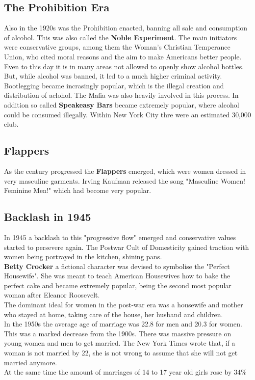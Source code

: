 \documentclass{article}
\begin{document}
	\subsection{The Prohibition Era}
	Also in the 1920s was the Prohibition enacted, banning all sale and consumption of alcohol. This was also called the \textbf{Noble Experiment}. The main initiators were conservative groups, among them the Woman's Christian Temperance Union, who cited moral reasons and the aim to make Americans better people. Even to this day it is in many areas not allowed to openly show alcohol bottles. \\
	But, while alcohol was banned, it led to a much higher criminal activity. Bootlegging became incrasingly popular, which is the illegal creation and distribution of aclohol. The Mafia was also heavily involved in this process. In addition so called \textbf{Speakeasy Bars} became extremely popular, where alcohol could be consumed illegally. Within New York City thre were an estimated 30,000 club. \\
	\subsection{Flappers}
	As the century progressed the \textbf{Flappers} emerged, which were women dressed in very masculine garments. Irving Kaufman released the song "Masculine Women! Feminine Men!" which had become very popular.
	\subsection{Backlash in 1945}
	In 1945 a backlash to this "progressive flow" emerged and conservative values started to persevere again. The Postwar Cult of Domesticity gained traction with women being portrayed in the kitchen, shining pans. \\
	\textbf{Betty Crocker} a fictional character was devised to symbolise the "Perfect Housewife". She was meant to teach American Housewives how to bake the perfect cake and became extremely popular, being the second most popular woman after Eleanor Roosevelt. \\
	The dominant ideal for women in the post-war era was a housewife and mother who stayed at home, taking care of the house, her husband and children. \\
	In the 1950s the average age of marriage was 22.8 for men and 20.3 for women. This was a marked decrease from the 1900s. There was massive pressure on young women and men to get married. The New York Times wrote that, if a woman is not married by 22, she is not wrong to assume that she will not get married anymore. \\
	At the same time the amount of marriages of 14 to 17 year old girls rose by 34\% \\
\end{document}
